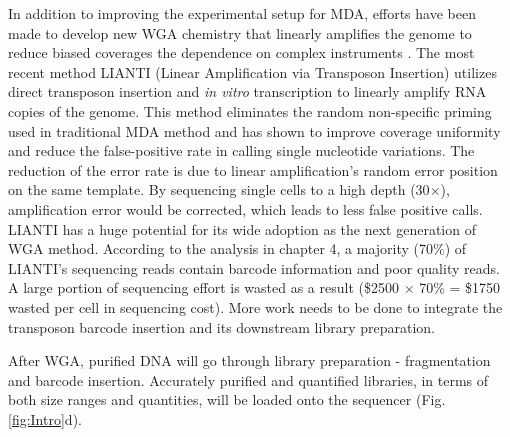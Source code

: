 
In addition to improving the experimental setup for MDA, efforts have been made to develop new WGA chemistry that linearly amplifies the genome to reduce biased coverages the dependence on complex instruments \cite{Zong:2012bs,Chen:2017hq}. The most recent method LIANTI (Linear Amplification via Transposon Insertion) utilizes direct transposon insertion and \textit{in vitro} transcription to linearly amplify RNA copies of the genome. This method eliminates the random non-specific priming used in traditional MDA method and has shown to improve coverage uniformity and reduce the false-positive rate in calling single nucleotide variations. The reduction of the error rate is due to linear amplification's random error position on the same template. By sequencing single cells to a high depth (30$\times$), amplification error would be corrected, which leads to less false positive calls. LIANTI has a huge potential for its wide adoption as the next generation of WGA method. According to the analysis in chapter 4, a majority (70\%) of LIANTI's sequencing reads contain barcode information and poor quality reads. A large portion of sequencing effort is wasted as a result (\$2500 $\times$ 70\% = \$1750 wasted per cell in sequencing cost). More work needs to be done to integrate the transposon barcode insertion and its downstream library preparation.

After WGA, purified DNA will go through library preparation - fragmentation and barcode insertion. Accurately purified and quantified libraries, in terms of both size ranges and quantities, will be loaded onto the sequencer (Fig. \ref{fig:Intro}d). 
 
